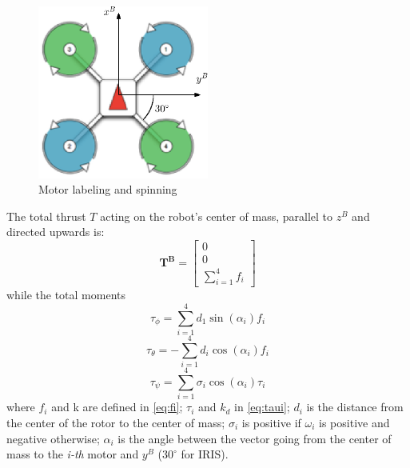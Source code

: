 \begin{figure}[h]
\centering
 \includegraphics[width=0.5\textwidth]{top_iris.eps}
 \caption[Motor rotations]{Motor labeling and spinning}
 \label{figure:motorspin}
\end{figure}

\noindent
The total thrust $T$ acting on the robot's center of mass, parallel to $z^B$ and directed upwards is:
\begin{equation}
\boldsymbol{T^B}=\begin{bmatrix}0\\0\\\sum_{i=1}^{4}f_i
\end{bmatrix}
\label{eq:T}
\end{equation}
while the total moments
\begin{equation}
\tau_\phi = \sum_{i=1}^{4}d_1\sin(\alpha_i) f_i
\label{eq:tauph}
\end{equation}
\begin{equation}
\tau_\theta = -\sum_{i=1}^{4}d_i\cos(\alpha_i) f_i
\label{eq:tauth}
\end{equation}
\begin{equation}
\tau_\psi = \sum_{i=1}^{4}\sigma_i\cos(\alpha_i) \tau_i
\label{eq:taups}
\end{equation}
where $f_i$ and k are defined in \eqref{eq:fi}; $\tau_i$ and $k_d$ in \eqref{eq:taui}; $d_i$ is the distance from the center of the rotor to the center of mass; $\sigma_i$ is positive if $\omega_i$ is positive and negative otherwise; $\alpha_i$ is the angle between the vector going from the center of mass to the \textit{i-th} motor and $y^B$ ($30^\circ$ for IRIS).\\

